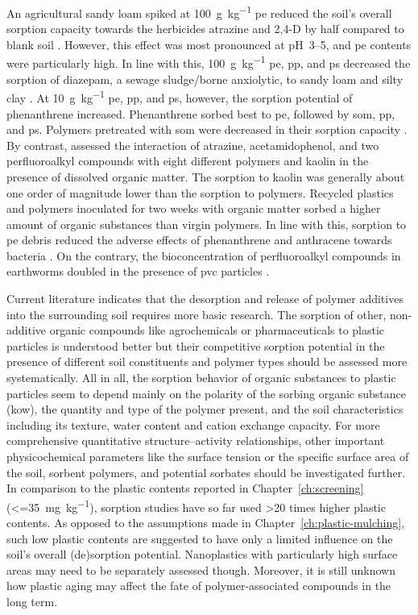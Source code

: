 An agricultural sandy loam spiked at \SI{100}{\gram\per\kilo\gram} \ac{pe} reduced the soil's overall sorption capacity towards the herbicides atrazine and 2,4-D by half compared to blank soil \citep{HufferPolyethylene2019}. However, this effect was most pronounced at pH~\numrange{3}{5}, and \ac{pe} contents were particularly high. In line with this, \SI{100}{\gram\per\kilo\gram} \ac{pe}, \ac{pp}, and \ac{ps} decreased the sorption of diazepam, a sewage sludge\-/borne anxiolytic, to sandy loam and silty clay \citep{XuContrasting2021}. At \SI{10}{\gram\per\kilo\gram} \ac{pe}, \ac{pp}, and \ac{ps}, however, the sorption potential of phenanthrene increased. Phenanthrene sorbed best to \ac{pe}, followed by \ac{som}, \ac{pp}, and \ac{ps}. Polymers pretreated with \ac{som} were decreased in their sorption capacity \citep{XuContrasting2021}.
By contrast, \citet{AteiaSorption2020} assessed the interaction of atrazine, acetamidophenol, and two perfluoroalkyl compounds with eight different polymers and kaolin in the presence of dissolved organic matter. The sorption to kaolin was generally about one order of magnitude lower than the sorption to polymers. Recycled plastics and polymers inoculated for two weeks with organic matter sorbed a higher amount of organic substances than virgin polymers.
In line with this, sorption to \ac{pe} debris reduced the adverse effects of phenanthrene and anthracene towards bacteria \citep{KleinteichMicroplastics2018}. On the contrary, the bioconcentration of perfluoroalkyl compounds in earthworms doubled in the presence of \ac{pvc} particles \citep{SobhaniMicroplastics2021}.

Current literature indicates that the desorption and release of polymer additives into the surrounding soil requires more basic research. The sorption of other, non-additive organic compounds like agrochemicals or pharmaceuticals to plastic particles is understood better but their competitive sorption potential in the presence of different soil constituents and polymer types should be assessed more systematically. All in all, the sorption behavior of organic substances to plastic particles seem to depend mainly on the polarity of the sorbing organic substance (\ac{kow}), the quantity and type of the polymer present, and the soil characteristics including its texture, water content and cation exchange capacity. For more comprehensive quantitative structure--activity relationships, other important physicochemical parameters like the surface tension or the specific surface area of the soil, sorbent polymers, and potential sorbates should be investigated further.
In comparison to the plastic contents reported in Chapter~\ref{ch:screening} (\SI{<=35}{\milli\gram\per\kilo\gram}), sorption studies have so far used \num{>20} times higher plastic contents. As opposed to the assumptions made in Chapter~\ref{ch:plastic-mulching}, such low plastic contents are suggested to have only a limited influence on the soil's overall (de)sorption potential. Nanoplastics with particularly high surface areas may need to be separately assessed though. Moreover, it is still unknown how plastic aging may affect the fate of polymer-associated compounds in the long term.

